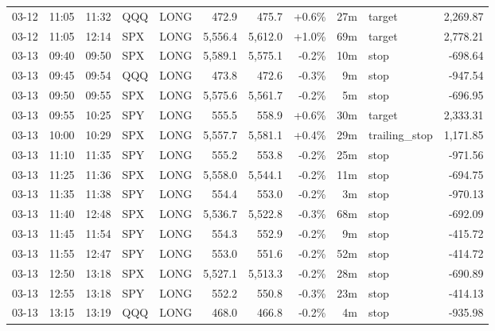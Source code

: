 \documentclass[11pt,a4paper,twoside]{article}
\begin{document}
\begin{center}
\begin{longtable}{>{\color{txtmain}}l l l l l r r r r >{\color{txtmain}}l r}
03-12 & 11:05 & 11:32 & QQQ & LONG & 472.9 & 475.7 & \textcolor{wingreen}{+0.6\%} & 27m & target & \textcolor{wingreen}{2,269.87} \\
03-12 & 11:05 & 12:14 & SPX & LONG & 5,556.4 & 5,612.0 & \textcolor{wingreen}{+1.0\%} & 69m & target & \textcolor{wingreen}{2,778.21} \\
03-13 & 09:40 & 09:50 & SPX & LONG & 5,589.1 & 5,575.1 & \textcolor{lossred}{-0.2\%} & 10m & stop & \textcolor{lossred}{-698.64} \\
03-13 & 09:45 & 09:54 & QQQ & LONG & 473.8 & 472.6 & \textcolor{lossred}{-0.3\%} & 9m & stop & \textcolor{lossred}{-947.54} \\
03-13 & 09:50 & 09:55 & SPX & LONG & 5,575.6 & 5,561.7 & \textcolor{lossred}{-0.2\%} & 5m & stop & \textcolor{lossred}{-696.95} \\
03-13 & 09:55 & 10:25 & SPY & LONG & 555.5 & 558.9 & \textcolor{wingreen}{+0.6\%} & 30m & target & \textcolor{wingreen}{2,333.31} \\
03-13 & 10:00 & 10:29 & SPX & LONG & 5,557.7 & 5,581.1 & \textcolor{wingreen}{+0.4\%} & 29m & trailing\_stop & \textcolor{wingreen}{1,171.85} \\
03-13 & 11:10 & 11:35 & SPY & LONG & 555.2 & 553.8 & \textcolor{lossred}{-0.2\%} & 25m & stop & \textcolor{lossred}{-971.56} \\
03-13 & 11:25 & 11:36 & SPX & LONG & 5,558.0 & 5,544.1 & \textcolor{lossred}{-0.2\%} & 11m & stop & \textcolor{lossred}{-694.75} \\
03-13 & 11:35 & 11:38 & SPY & LONG & 554.4 & 553.0 & \textcolor{lossred}{-0.2\%} & 3m & stop & \textcolor{lossred}{-970.13} \\
03-13 & 11:40 & 12:48 & SPX & LONG & 5,536.7 & 5,522.8 & \textcolor{lossred}{-0.3\%} & 68m & stop & \textcolor{lossred}{-692.09} \\
03-13 & 11:45 & 11:54 & SPY & LONG & 554.3 & 552.9 & \textcolor{lossred}{-0.2\%} & 9m & stop & \textcolor{lossred}{-415.72} \\
03-13 & 11:55 & 12:47 & SPY & LONG & 553.0 & 551.6 & \textcolor{lossred}{-0.2\%} & 52m & stop & \textcolor{lossred}{-414.72} \\
03-13 & 12:50 & 13:18 & SPX & LONG & 5,527.1 & 5,513.3 & \textcolor{lossred}{-0.2\%} & 28m & stop & \textcolor{lossred}{-690.89} \\
03-13 & 12:55 & 13:18 & SPY & LONG & 552.2 & 550.8 & \textcolor{lossred}{-0.3\%} & 23m & stop & \textcolor{lossred}{-414.13} \\
03-13 & 13:15 & 13:19 & QQQ & LONG & 468.0 & 466.8 & \textcolor{lossred}{-0.2\%} & 4m & stop & \textcolor{lossred}{-935.98} \\

\end{longtable}
\end{center}
\end{document}
